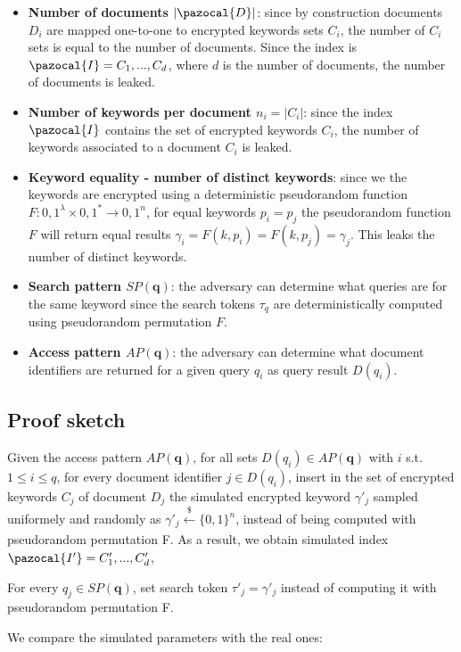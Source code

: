 \begin{itemize}
    \item \textbf{Number of documents $|\pazocal{D}|$}: since by construction documents $D_i$ are mapped one-to-one to encrypted keywords sets $C_i$, the number of $C_i$ sets is equal to the number of documents. Since the index is $\pazocal{I}={C_1,...,C_d}$, where $d$ is the number of documents, the number of documents is leaked.
    \item \textbf{Number of keywords per document $n_i=|C_i|$}: since the index $\pazocal{I}$ contains the set of encrypted keywords $C_i$, the number of keywords associated to a document $C_i$ is leaked.
    \item \textbf{Keyword equality - number of distinct keywords}: since we the keywords are encrypted using a deterministic pseudorandom function $F:{0,1}^\lambda \times {0,1}^* \rightarrow {0,1}^n$, for equal keywords $p_i = p_j$ the pseudorandom function $F$ will return equal results $\gamma _i=F(k,p_i)=F(k,p_j)=\gamma _j$. This leaks the number of distinct keywords.
    \item \textbf{Search pattern $SP(\textbf{q})$}: the adversary can determine what queries are for the same keyword since the search tokens $\tau _q$ are deterministically computed using pseudorandom permutation $F$.
    \item \textbf{Access pattern $AP(\textbf{q})$}: the adversary can determine what document identifiers are returned for a given query $q_i$ as query result $D(q_i)$.
\end{itemize}

\subsection{Proof sketch}

Given the access pattern $AP(\textbf{q})$, for all sets $D(q_i)\in AP(\textbf{q})$ with $i$ s.t. $1\leq i\leq q$, for every document identifier $j\in D(q_i)$, insert in the set of encrypted keywords $C_j$ of document $D_j$ the simulated encrypted keyword $\gamma '_j$ sampled uniformely and randomly as $\gamma '_j\xleftarrow[]{\text{\$}}\{0,1\}^n$, instead of being computed with pseudorandom permutation F. As a result, we obtain simulated index $\pazocal{I'}={C'_1,...,C'_d}$,

For every $q_j\in SP(\textbf{q})$, set search token $\tau '_j=\gamma '_j$ instead of computing it with pseudorandom permutation F.

We compare the simulated parameters with the real ones:

